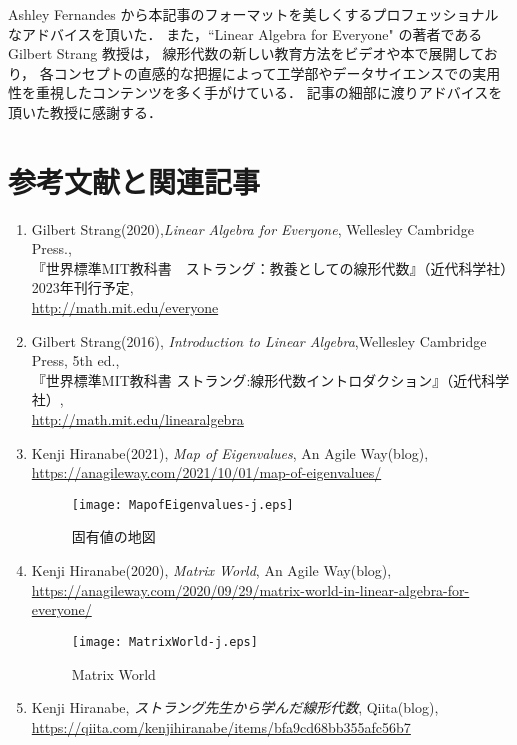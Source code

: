 \documentclass[letterpaper]{article}
\begin{document}
Ashley Fernandes から本記事のフォーマットを美しくするプロフェッショナルなアドバイスを頂いた．
また，``Linear Algebra for Everyone" の著者である Gilbert Strang 教授は，
線形代数の新しい教育方法をビデオや本で展開しており，
各コンセプトの直感的な把握によって工学部やデータサイエンスでの実用性を重視したコンテンツを多く手がけている．
記事の細部に渡りアドバイスを頂いた教授に感謝する．

\section*{参考文献と関連記事}
\begin{enumerate}
  \item 
  Gilbert Strang(2020),\emph{Linear Algebra for Everyone}, Wellesley Cambridge Press.,\\
  『世界標準MIT教科書　ストラング：教養としての線形代数』（近代科学社）2023年刊行予定, \\
  \href{http://math.mit.edu/everyone}{http://math.mit.edu/everyone}
  \item
  Gilbert Strang(2016), \emph{Introduction to Linear Algebra},Wellesley Cambridge Press, 5th ed.,\\
  『世界標準MIT教科書 ストラング:線形代数イントロダクション』（近代科学社）,\\
  \href{http://math.mit.edu/linearalgebra}{http://math.mit.edu/linearalgebra}
  \item Kenji Hiranabe(2021), \emph{Map of Eigenvalues}, An Agile Way(blog),\\
  \href{https://anagileway.com/2021/10/01/map-of-eigenvalues/}{https://anagileway.com/2021/10/01/map-of-eigenvalues/}\\
  \begin{figure}[H]
    \texttt{[image: MapofEigenvalues-j.eps]}
    \caption{固有値の地図}
  \end{figure}
  \item Kenji Hiranabe(2020), \emph{Matrix World}, An Agile Way(blog),\\
  \href{https://anagileway.com/2020/09/29/matrix-world-in-linear-algebra-for-everyone/}{https://anagileway.com/2020/09/29/matrix-world-in-linear-algebra-for-everyone/}\\
  \begin{figure}[H]
    \texttt{[image: MatrixWorld-j.eps]}
    \caption{Matrix World}
  \end{figure}
  \item Kenji Hiranabe, \emph{ストラング先生から学んだ線形代数}, Qiita(blog),\\
  \href{https://qiita.com/kenjihiranabe/items/bfa9cd68bb355afc56b7}{https://qiita.com/kenjihiranabe/items/bfa9cd68bb355afc56b7}\\
 \end{enumerate}
\end{document}
